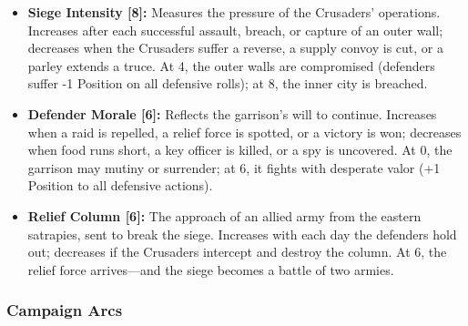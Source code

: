 \documentclass[11pt]{article}
\begin{document}
\begin{itemize}
    \item \textbf{Siege Intensity [8]:} Measures the pressure of the Crusaders' operations. Increases after each successful assault, breach, or capture of an outer wall; decreases when the Crusaders suffer a reverse, a supply convoy is cut, or a parley extends a truce. At 4, the outer walls are compromised (defenders suffer -1 Position on all defensive rolls); at 8, the inner city is breached.
    \item \textbf{Defender Morale [6]:} Reflects the garrison's will to continue. Increases when a raid is repelled, a relief force is spotted, or a victory is won; decreases when food runs short, a key officer is killed, or a spy is uncovered. At 0, the garrison may mutiny or surrender; at 6, it fights with desperate valor (+1 Position to all defensive actions).
    \item \textbf{Relief Column [6]:} The approach of an allied army from the eastern satrapies, sent to break the siege. Increases with each day the defenders hold out; decreases if the Crusaders intercept and destroy the column. At 6, the relief force arrives—and the siege becomes a battle of two armies.
\end{itemize}

\subsubsection{Campaign Arcs}
\end{document}
